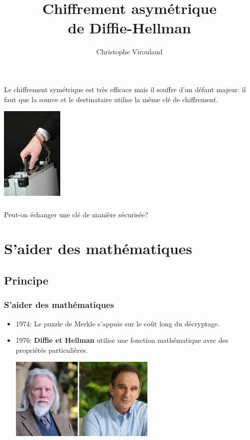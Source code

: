 \documentclass[svgnames,11pt]{beamer}
\author[]{Christophe Viroulaud}
\title{Chiffrement asymétrique\\de Diffie-Hellman}
\date{\framebox{\textbf{Archi 22}}}
\institute{Terminale - NSI}
\begin{document}
\begin{frame}
    \titlepage
\end{frame}

\begin{frame}
    Le chiffrement symétrique est très efficace mais il souffre d'un défaut majeur: il faut que la source et le destinataire utilise la même clé de chiffrement.
    \begin{center}
        \centering
        \includegraphics[width=3cm]{ressources/echange.jpg}
    \end{center}

\end{frame}
\begin{frame}
    \frametitle{}

    \begin{framed}
        \centering Peut-on échanger une clé de manière sécurisée?
    \end{framed}
\end{frame}
\section{S'aider des mathématiques}
\subsection{Principe}
\begin{frame}
    \frametitle{S'aider des mathématiques}
    \begin{itemize}
        \item<1-> 1974: Le puzzle de Merkle s'appuie sur le coût long du décryptage.
        \item<2-> 1976: \textbf{Diffie et Hellman} utilise une fonction mathématique avec des propriétés particulières.
        \begin{center}
            \centering
            \includegraphics[width=7cm]{ressources/diffie-hellman.jpg}
            \label{IMG}
            \end{center}
    \end{itemize}


\end{frame}
\end{document}
